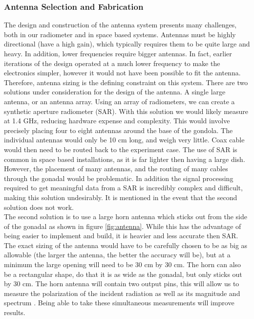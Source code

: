 \documentclass[12pt]{article}
\begin{document}
\subsubsection{Antenna Selection and Fabrication} \label{sec:antenna}
The design and construction of the antenna system presents many challenges, both in our radiometer and in space based systems. Antennas must be highly directional (have a high gain), which typically requires them to be quite large and heavy. In addition, lower frequencies require bigger antennas. In fact, earlier iterations of the design operated at a much lower frequency to make the electronics simpler, however it would not have been possible to fit the antenna. Therefore, antenna sizing is the defining constraint on this system. There are two solutions under consideration for the design of the antenna. A single large antenna, or an antenna array. Using an array of radiometers, we can create a synthetic aperture radiometer (SAR). With this solution we would likely measure at 1.4 GHz, reducing hardware expense and complexity. This would involve precisely placing four to eight antennas around the base of the gondola. The individual antennas would only be 10 cm long, and weigh very little. Coax cable would then need to be routed back to the experiment case. The use of SAR is common in space based installations, as it is far lighter then having a large dish\cite{skou1989microwave}. However, the placement of many antennas, and the routing of many cables through the gonadal would be problematic. In addition the signal processing required to get meaningful data from a SAR is incredibly complex and difficult, making this solution undesirably. It is mentioned in the event that the second solution does not work.\\The second solution is to use a large horn antenna which sticks out from the side of the gonadal as shown in figure \ref{fig:antenna}. While this has the advantage of being easier to implement and build, it is heavier and less accurate then SAR. The exact sizing of the antenna would have to be carefully chosen to be as big as allowable (the larger the antenna, the better the accuracy will be), but at a minimum the large opening will need to be 30 cm by 30 cm. The horn can also be a rectangular shape, do that it is as wide as the gonadal, but only sticks out by 30 cm. The horn antenna will contain two output pins, this will allow us to measure the polarization of the incident radiation as well as its magnitude and spectrum \cite{constantine2005antenna}. Being able to take these simultaneous measurements will improve results.
\end{document}
